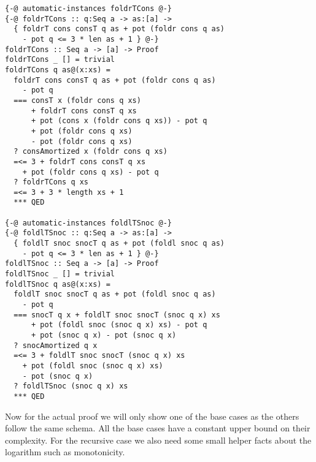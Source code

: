 \documentclass[sigplan,screen,review,anonymous]{acmart}
\begin{document}
\begin{lstlisting}
{-@ automatic-instances foldrTCons @-}
{-@ foldrTCons :: q:Seq a -> as:[a] ->
  { foldrT cons consT q as + pot (foldr cons q as)
    - pot q <= 3 * len as + 1 } @-}
foldrTCons :: Seq a -> [a] -> Proof
foldrTCons _ [] = trivial
foldrTCons q as@(x:xs) =
  foldrT cons consT q as + pot (foldr cons q as)
    - pot q
  === consT x (foldr cons q xs)
      + foldrT cons consT q xs
      + pot (cons x (foldr cons q xs)) - pot q
      + pot (foldr cons q xs)
      - pot (foldr cons q xs)
  ? consAmortized x (foldr cons q xs)
  =<= 3 + foldrT cons consT q xs
    + pot (foldr cons q xs) - pot q
  ? foldrTCons q xs
  =<= 3 + 3 * length xs + 1
  *** QED

{-@ automatic-instances foldlTSnoc @-}
{-@ foldlTSnoc :: q:Seq a -> as:[a] ->
  { foldlT snoc snocT q as + pot (foldl snoc q as)
    - pot q <= 3 * len as + 1 } @-}
foldlTSnoc :: Seq a -> [a] -> Proof
foldlTSnoc _ [] = trivial
foldlTSnoc q as@(x:xs) =
  foldlT snoc snocT q as + pot (foldl snoc q as)
    - pot q
  === snocT q x + foldlT snoc snocT (snoc q x) xs
      + pot (foldl snoc (snoc q x) xs) - pot q
      + pot (snoc q x) - pot (snoc q x)
  ? snocAmortized q x
  =<= 3 + foldlT snoc snocT (snoc q x) xs
    + pot (foldl snoc (snoc q x) xs)
    - pot (snoc q x)
  ? foldlTSnoc (snoc q x) xs
  *** QED
\end{lstlisting}

Now for the actual proof we will only show one of the base cases as the others follow the same schema. All the base cases have a constant upper bound on their complexity. For the recursive case we also need some small helper facts about the logarithm such as monotonicity.
\end{document}
